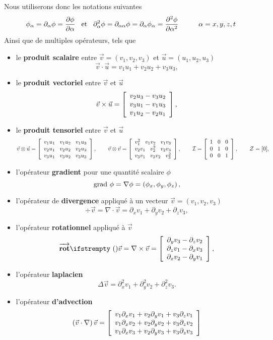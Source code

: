\noindent Nous utiliserons donc les notations suivantes 
\[\phi_\alpha = \partial_\alpha\phi = \frac{\partial \phi}{\partial \alpha} \hspace{3mm} \text{et}\hspace{3mm} \partial_\alpha^2\phi = \partial_{\alpha\alpha}\phi = \partial_\alpha\phi_\alpha = \frac{\partial^2 \phi}{\partial \alpha^2}\hspace{1cm}\alpha= x, y, z, t\]
\noindent Ainsi que de multiples opérateurs, tels que
\begin{itemize}[label=$\mybullet$]
	\item le \textbf{produit scalaire} entre $\vec{v} = \left(v_1, v_2, v_3\right)$ et $\vec{u} = \left(u_1, u_2, u_3\right)$
\[ \vec{v}\cdot\vec{u} = v_1u_1+v_2u_2+v_3u_3,\]
	\item le \textbf{produit vectoriel} entre $\vec{v}$ et $\vec{u}$
\[ \vec{v}\times\vec{u} = \left[\begin{array}{c} v_2u_3-v_3u_2\\ v_3u_1-v_1u_3\\ v_1u_2-v_2u_1 \end{array}\right],\]
	\item le \textbf{produit tensoriel} entre $\vec{v}$ et $\vec{u}$
\[ \vec{v}\otimes \vec{u} = \left[\begin{array}{c} v_1u_1\hspace{3mm} v_1u_2\hspace{3mm} v_1u_3\\ v_2u_1\hspace{3mm} v_2u_2\hspace{3mm} v_2u_3\\ v_3u_1\hspace{3mm} v_3u_2\hspace{3mm} v_3u_3 \end{array}\right], \hspace{0.7cm} \vec{v}\otimes\vec{v} = \left[\begin{array}{c} v_1^2\hspace{3mm} v_1v_2\hspace{3mm} v_1v_3\\ v_2v_1\hspace{3mm} v_2^2\hspace{3mm} v_2v_3\\ v_3v_1\hspace{3mm} v_3v_2\hspace{3mm} v_3^2 \end{array}\right],\hspace{0.7cm} \mathcal{I} = \left[\begin{array}{c} 1 \hspace{3mm} 0 \hspace{3mm} 0\\ 0 \hspace{3mm} 1 \hspace{3mm} 0\\ 0 \hspace{3mm} 0 \hspace{3mm} 1 \end{array}\right], \hspace{0.7cm}\mathcal{Z} = [0], \]
	\item l'opérateur \textbf{gradient} pour une quantité scalaire $\phi$
\[\text{grad}~\phi = \nabla \phi = \left(\phi_x, \phi_y, \phi_z\right), \]
	\item l'opérateur de \textbf{divergence} appliqué à un vecteur $\vec{v} = \left(v_1, v_2, v_3\right)$
\[\div\vec{v} = \nabla\cdot\vec{v} = \partial_x v_1 + \partial_y v_2 + \partial_z v_3, \]
	\item l'opérateur \textbf{rotationnel} appliqué à $\vec{v}$
\[ \rot \vec{v} = \nabla \times \vec{v} = \myvector{\partial_y v_3-\partial_z v_2}{\partial_z v_1-\partial_x v_3}{\partial_x v_2-\partial_y v_1}, \]
	\item l'opérateur \textbf{laplacien}
\[\Delta\vec{v} = \partial_x^2 v_1 + \partial_y^2 v_2 + \partial_z^2 v_3. \]
	\item l'opérateur\textbf{ d'advection}
	\[\left(\vec{v}\cdot \nabla \right)\vec{v} = \left[\begin{array}{c} v_1 \partial_x v_1 + v_2 \partial_y v_1 + v_3 \partial_z v_1\\ v_1 \partial_x v_2 + v_2 \partial_y v_2 + v_3 \partial_z v_2\\ v_1 \partial_x v_3 + v_2 \partial_y v_3 + v_3 \partial_z v_3 \end{array}\right] \]
\end{itemize} 

